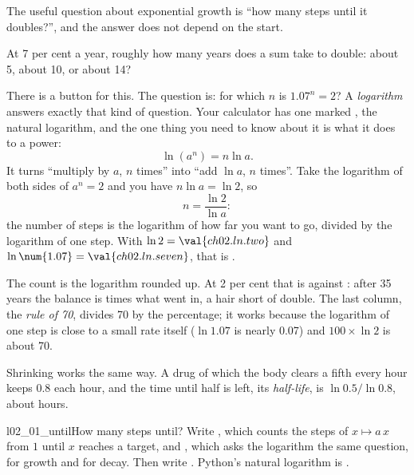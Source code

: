 \noindent
The useful question about exponential growth is \enquote{how many steps
until it doubles?}, and the answer does not depend on the start.

\begin{think}
At 7 per cent a year, roughly how many years does a sum take to double:
about 5, about 10, or about 14?
\end{think}
There is a button for this. The question is: for which $n$ is
$\num{1.07}^n = 2$? A \emph{logarithm} answers exactly that kind of
question. Your calculator has one marked , the natural logarithm,
and the one thing you need to know about it is what it does to a power:
\[ \ln (a^n) = n \ln a . \]
It turns \enquote{multiply by $a$, $n$ times} into \enquote{add $\ln a$, $n$
times}. Take the logarithm of both sides of $a^n = 2$ and you have
$n \ln a = \ln 2$, so
\[ n = \frac{\ln 2}{\ln a} : \]
the number of steps is the logarithm of how far you want to go, divided by
the logarithm of one step. With $\ln 2 = \val{ch02.ln.two}$ and
$\ln \num{1.07} = \val{ch02.ln.seven}$, that is .



\noindent
The count is the logarithm rounded up. At 2 per cent that is
 against : after 35 years
the balance is  times what went in, a hair short of
double. The last column, the \emph{rule of 70}, divides 70 by the
percentage; it works because the logarithm of one step is close to a
small rate itself ($\ln \num{1.07}$ is nearly \num{0.07}) and
$100 \times \ln 2$ is about 70.

Shrinking works the same way. A drug of which the body clears a fifth every
hour keeps \num{0.8} each hour, and the time until half is left, its
\emph{half-life}, is $\ln \num{0.5} / \ln \num{0.8}$, about
 hours.

\begin{lab}{l02_01_until}{How many steps until?}
Write , which counts the steps of $x \mapsto a\,x$ from
$1$ until $x$ reaches a target, and , which asks the
logarithm the same question, for growth and for decay. Then write
. Python's natural logarithm is .
\end{lab}

